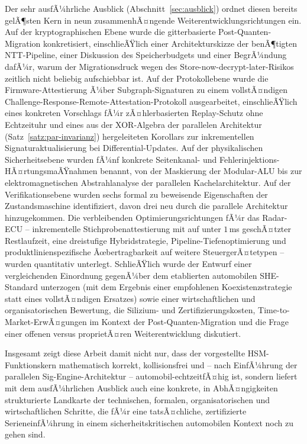 ﻿\documentclass[a4paper,12pt]{article}
\theoremstyle{definition}
\begin{document}
Der sehr ausfÃ¼hrliche Ausblick (Abschnitt~\ref{sec:ausblick}) ordnet diesen bereits gelÃ¶sten Kern in neun zusammenhÃ¤ngende Weiterentwicklungsrichtungen ein. Auf der kryptographischen Ebene wurde die gitterbasierte Post-Quanten-Migration konkretisiert, einschlieÃŸlich einer Architekturskizze der benÃ¶tigten NTT-Pipeline, einer Diskussion des Speicherbudgets und einer BegrÃ¼ndung dafÃ¼r, warum der Migrationsdruck wegen des Store-now-decrypt-later-Risikos zeitlich nicht beliebig aufschiebbar ist. Auf der Protokollebene wurde die Firmware-Attestierung Ã¼ber Subgraph-Signaturen zu einem vollstÃ¤ndigen Challenge-Response-Remote-Attestation-Protokoll ausgearbeitet, einschlieÃŸlich eines konkreten Vorschlags fÃ¼r zÃ¤hlerbasierten Replay-Schutz ohne Echtzeituhr und eines aus der XOR-Algebra der parallelen Architektur (Satz~\ref{satz:par-invarianz}) hergeleiteten Korollars zur inkrementellen Signaturaktualisierung bei Differential-Updates. Auf der physikalischen Sicherheitsebene wurden fÃ¼nf konkrete Seitenkanal- und Fehlerinjektions-HÃ¤rtungsmaÃŸnahmen benannt, von der Maskierung der Modular-ALU bis zur elektromagnetischen Abstrahlanalyse der parallelen Kachelarchitektur. Auf der Verifikationsebene wurden sechs formal zu beweisende Eigenschaften der Zustandsmaschine identifiziert, davon drei neu durch die parallele Architektur hinzugekommen. Die verbleibenden Optimierungsrichtungen fÃ¼r das Radar-ECU -- inkrementelle Stichprobenattestierung mit auf unter $1$\,ms geschÃ¤tzter Restlaufzeit, eine dreistufige Hybridstrategie, Pipeline-Tiefenoptimierung und produktlinienspezifische Ãœbertragbarkeit auf weitere SteuergerÃ¤tetypen -- wurden quantitativ unterlegt. SchlieÃŸlich wurde der Entwurf einer vergleichenden Einordnung gegenÃ¼ber dem etablierten automobilen SHE-Standard unterzogen (mit dem Ergebnis einer empfohlenen Koexistenzstrategie statt eines vollstÃ¤ndigen Ersatzes) sowie einer wirtschaftlichen und organisatorischen Bewertung, die Silizium- und Zertifizierungskosten, Time-to-Market-ErwÃ¤gungen im Kontext der Post-Quanten-Migration und die Frage einer offenen versus proprietÃ¤ren Weiterentwicklung diskutiert.

Insgesamt zeigt diese Arbeit damit nicht nur, dass der vorgestellte HSM-Funktionskern mathematisch korrekt, kollisionsfrei und -- nach EinfÃ¼hrung der parallelen Sig-Engine-Architektur -- automobil-echtzeitfÃ¤hig ist, sondern liefert mit dem ausfÃ¼hrlichen Ausblick auch eine konkrete, in AbhÃ¤ngigkeiten strukturierte Landkarte der technischen, formalen, organisatorischen und wirtschaftlichen Schritte, die fÃ¼r eine tatsÃ¤chliche, zertifizierte SerieneinfÃ¼hrung in einem sicherheitskritischen automobilen Kontext noch zu gehen sind.
\end{document}
